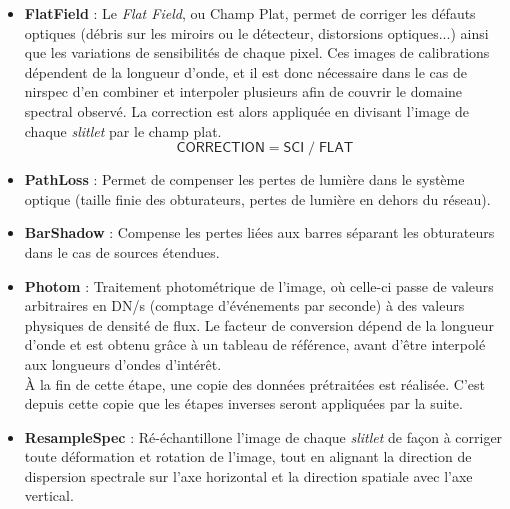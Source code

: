 \documentclass[12pt, a4paper]{article}
\begin{document}
\begin{itemize}
  \item \textbf{FlatField} : Le \textit{Flat Field}, ou Champ Plat, permet de corriger les défauts optiques (débris sur les miroirs ou le détecteur, distorsions optiques...) ainsi que les variations de sensibilités de chaque pixel. Ces images de calibrations dépendent de la longueur d'onde, et il est donc nécessaire dans le cas de \gls{nirspec} d'en combiner et interpoler plusieurs afin de couvrir le domaine spectral observé. La correction est alors appliquée en divisant l'image de chaque \textit{slitlet} par le champ plat.
  \begin{equation}
    \mathsf{CORRECTION} = \mathsf{SCI} \; / \; \mathsf{FLAT} 
  \end{equation}

  \item \textbf{PathLoss} : Permet de compenser les pertes de lumière dans le système optique (taille finie des obturateurs, pertes de lumière en dehors du réseau).
  
  \item \textbf{BarShadow} : Compense les pertes liées aux barres séparant les obturateurs dans le cas de sources étendues.
  
  \item \textbf{Photom} : Traitement photométrique de l'image, où celle-ci passe de valeurs arbitraires en DN/s (comptage d'événements par seconde) à des valeurs physiques de densité de flux. Le facteur de conversion dépend de la longueur d'onde et est obtenu grâce à un tableau de référence, avant d'être interpolé aux longueurs d'ondes d'intérêt.\\
  
  À la fin de cette étape, une copie des données prétraitées est réalisée. C'est depuis cette copie que les étapes inverses seront appliquées par la suite.
  
  \item \textbf{ResampleSpec} : Ré-échantillone l'image de chaque \textit{slitlet} de façon à corriger toute déformation et rotation de l'image, tout en alignant la direction de dispersion spectrale sur l'axe horizontal et la direction spatiale avec l'axe vertical.
\end{itemize}
\end{document}
